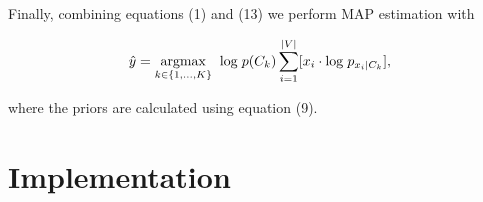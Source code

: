 \documentclass{article}
\begin{document}
\noindent
Finally, combining equations (1) and (13) we perform MAP estimation with

\begin{align}
\hat{y} = \underset{k \in \{1,\dots,K\}}{\rm{argmax}} \hspace{2mm} \mathrm{log}\hspace{1mm} p(C_k)\sum_{i=1}^{|V|} \lbrack x_i \cdot \mathrm{log} \hspace{1mm} p_{x_i|C_k} \rbrack,
\end{align}

\noindent
where the priors are calculated using equation (9).

\section{Implementation}
\end{document}
